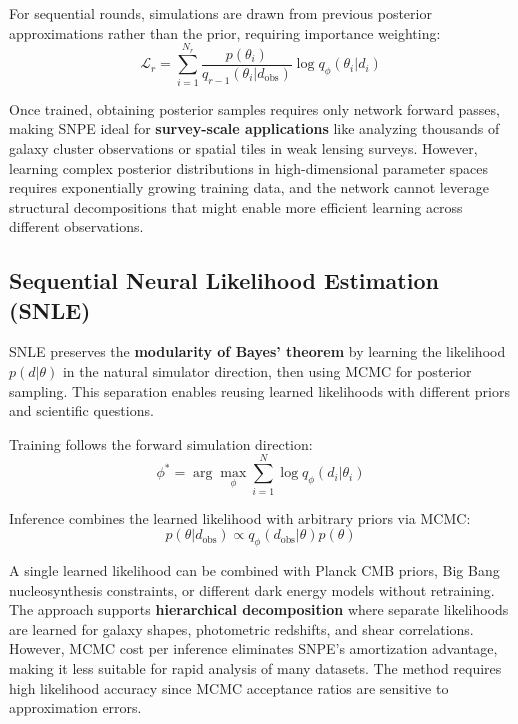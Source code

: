 \documentclass{SciPost}
\begin{document}
For sequential rounds, simulations are drawn from previous posterior approximations rather than the prior, requiring importance weighting:
\begin{equation}
    \mathcal{L}_r = \sum_{i=1}^{N_r} \frac{p(\theta_i)}{q_{r-1}(\theta_i|d_{\text{obs}})} \log q_\phi(\theta_i | d_i)
\end{equation}

Once trained, obtaining posterior samples requires only network forward passes, making SNPE ideal for \textbf{survey-scale applications} like analyzing thousands of galaxy cluster observations or spatial tiles in weak lensing surveys. However, learning complex posterior distributions in high-dimensional parameter spaces requires exponentially growing training data, and the network cannot leverage structural decompositions that might enable more efficient learning across different observations.

\subsection{Sequential Neural Likelihood Estimation (SNLE)}

SNLE preserves the \textbf{modularity of Bayes' theorem} by learning the likelihood $p(d|\theta)$ in the natural simulator direction, then using MCMC for posterior sampling. This separation enables reusing learned likelihoods with different priors and scientific questions.

Training follows the forward simulation direction:
\begin{equation}
    \phi^* = \arg\max_\phi \sum_{i=1}^N \log q_\phi(d_i | \theta_i)
\end{equation}

Inference combines the learned likelihood with arbitrary priors via MCMC:
\begin{equation}
    p(\theta|d_{\text{obs}}) \propto q_\phi(d_{\text{obs}}|\theta) p(\theta)
\end{equation}

A single learned likelihood can be combined with Planck CMB priors, Big Bang nucleosynthesis constraints, or different dark energy models without retraining. The approach supports \textbf{hierarchical decomposition} where separate likelihoods are learned for galaxy shapes, photometric redshifts, and shear correlations. However, MCMC cost per inference eliminates SNPE's amortization advantage, making it less suitable for rapid analysis of many datasets. The method requires high likelihood accuracy since MCMC acceptance ratios are sensitive to approximation errors.
\end{document}
